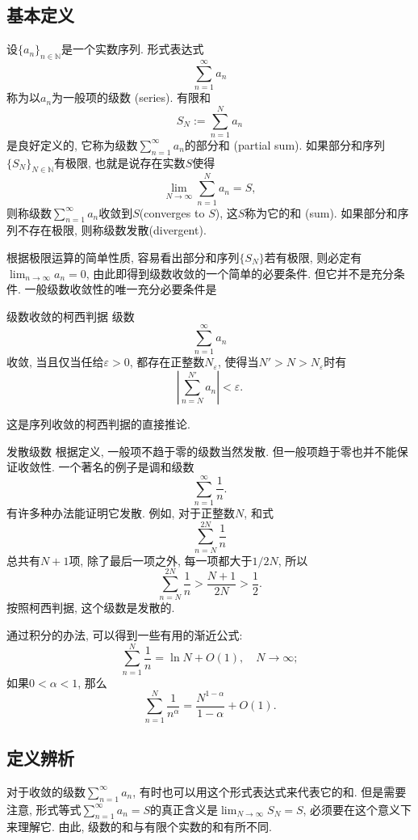

\subsection{基本定义}
设$\{a_n\}_{n\in\mathbb{N}}$是一个实数序列. 形式表达式
\[
\sum_{n=1}^\infty a_n
\]
称为以$a_n$为一般项的级数 (series). 有限和
\[
S_N:=\sum_{n=1}^N a_n
\]
是良好定义的, 它称为级数$\sum_{n=1}^\infty a_n$的部分和 (partial sum). 如果部分和序列$\{S_N\}_{N\in\mathbb{N}}$有极限, 也就是说存在实数$S$使得
\[
\lim_{N\to\infty}\sum_{n=1}^N a_n=S,
\] 
则称级数$\sum_{n=1}^\infty a_n$收敛到$S$(converges to $S$), 这$S$称为它的和 (sum). 如果部分和序列不存在极限, 则称级数发散(divergent). 

根据极限运算的简单性质, 容易看出部分和序列$\{S_N\}$若有极限, 则必定有$\lim_{n\to\infty}a_n=0$, 由此即得到级数收敛的一个简单的必要条件. 但它并不是充分条件. 一般级数收敛性的唯一充分必要条件是
\begin{theorem}{级数收敛的柯西判据}
级数
\[
\sum_{n=1}^\infty a_n
\]
收敛, 当且仅当任给$\varepsilon>0$, 都存在正整数$N_\varepsilon$, 使得当$N'>N>N_\varepsilon$时有
$$
\left|\sum_{n=N}^{N'} a_n\right|<\varepsilon.
$$
\end{theorem}
这是序列收敛的柯西判据的直接推论.

\begin{example}{发散级数}
根据定义, 一般项不趋于零的级数当然发散. 但一般项趋于零也并不能保证收敛性. 一个著名的例子是调和级数
$$
\sum_{n=1}^\infty\frac{1}{n}.
$$
有许多种办法能证明它发散. 例如, 对于正整数$N$, 和式
$$
\sum_{n=N}^{2N}\frac{1}{n}
$$
总共有$N+1$项, 除了最后一项之外, 每一项都大于$1/2N$, 所以
$$
\sum_{n=N}^{2N}\frac{1}{n}>\frac{N+1}{2N}>\frac{1}{2}.
$$
按照柯西判据, 这个级数是发散的.

通过积分的办法, 可以得到一些有用的渐近公式:
$$
\sum_{n=1}^{N}\frac{1}{n}=\ln N+O(1),\quad N\to\infty;
$$
如果$0<\alpha<1$, 那么
$$
\sum_{n=1}^{N}\frac{1}{n^\alpha}=\frac{N^{1-\alpha}}{1-\alpha}+O(1).
$$
\end{example}

\subsection{定义辨析}
对于收敛的级数$\sum_{n=1}^\infty a_n$, 有时也可以用这个形式表达式来代表它的和. 但是需要注意, 形式等式$\sum_{n=1}^\infty a_n=S$的真正含义是$\lim_{N\to\infty}S_N=S$, 必须要在这个意义下来理解它. 由此, 级数的和与有限个实数的和有所不同. 

